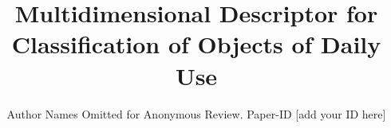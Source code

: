 \documentclass[conference]{sty/IEEEtran}
\begin{document}
\title{Multidimensional Descriptor for Classification of Objects of Daily Use}

\author{Author Names Omitted for Anonymous Review. Paper-ID [add your ID here]}





% 
\end{document}
